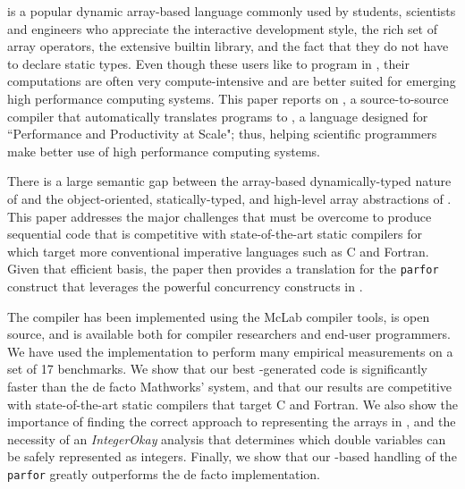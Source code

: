 \matlab is a popular dynamic array-based language commonly used by
students, scientists and engineers who appreciate the interactive
development style, the rich set of array operators, the extensive
builtin library, and the fact that they do not have to declare static
types. Even though these users like to program in \matlab, their
computations are often very compute-intensive and are better suited for
emerging high performance computing systems. This paper reports on \mixten, a
source-to-source compiler that automatically translates \matlab programs
to \xten, a language designed for ``Performance and Productivity at Scale";
thus, helping scientific programmers make better use of high performance
computing systems.

There is a large semantic gap between the array-based dynamically-typed nature 
of \matlab and the object-oriented, statically-typed, and high-level array
abstractions of \xten.   This paper addresses the major challenges that
must be overcome to produce sequential \xten code that is competitive with
state-of-the-art static compilers for \matlab which target more
conventional imperative languages such as C and Fortran.   Given that
efficient basis, the paper then provides a translation for the \matlab
\texttt{parfor} construct that leverages the powerful concurrency
constructs in \xten. 

The \mixten compiler has been implemented using the McLab compiler
tools, is open source, and is available both for compiler researchers
and end-user \matlab programmers.   We have used the implementation to
perform many empirical measurements on a set of 17 \matlab benchmarks.
We show that our best \mixten-generated code is significantly faster
than the de facto Mathworks' \matlab system,  and that our results are
competitive with state-of-the-art static compilers that target C and
Fortran.   We also show the importance of finding the correct approach
to representing the arrays in \xten,  and the necessity of an
\emph{IntegerOkay}  analysis that determines which double variables
can be safely represented as integers.    Finally, we show that our
\xten-based handling of the \matlab \texttt{parfor} greatly outperforms
the de facto \matlab implementation. 
